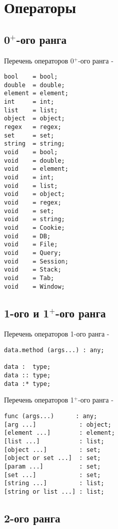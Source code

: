 \section{Операторы}

\subsection{0$^+$-ого ранга}

\noindent Перечень операторов 0$^+$-ого ранга -
\begin{lstlisting}[numbers=none]
bool    = bool;
double  = double;
element = element;
int     = int;
list    = list;
object  = object;
regex   = regex;
set     = set;
string  = string;
void    = bool;
void    = double;
void    = element;
void    = int;
void    = list;
void    = object;
void    = regex;
void    = set;
void    = string;
void    = Cookie;
void    = DB;
void    = File;
void    = Query;
void    = Session;
void    = Stack;
void    = Tab;
void    = Window;
\end{lstlisting}

\subsection{1-ого и 1$^+$-ого ранга}

\noindent Перечень операторов 1-ого ранга -
\begin{lstlisting}[numbers=none]
data.method (args...) : any;

data :  type;
data :: type;
data :* type;
\end{lstlisting}

\noindent Перечень операторов 1$^+$-ого ранга -
\begin{lstlisting}[numbers=none]
func (args...)      : any;
[arg ...]            : object;
[element ...]        : element;
[list ...]           : list;
[object ...]         : set;
[object or set ...]  : set;
[param ...]          : set;
[set ...]            : set;
[string ...]         : list;
[string or list ...] : list;
\end{lstlisting}

\subsection{2-ого ранга}

